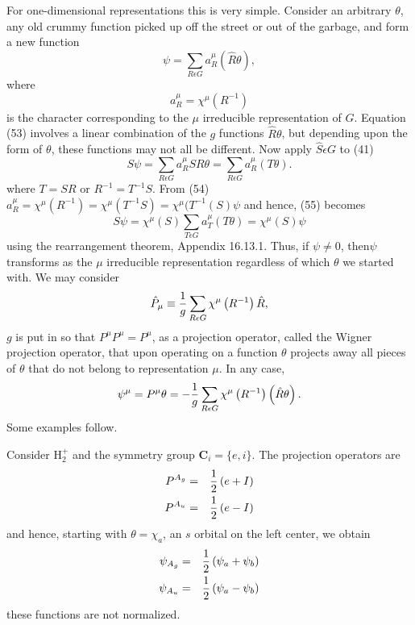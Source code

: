 For one-dimensional representations this is very simple.  Consider an 
arbitrary $\theta$, any old crummy function picked up off the street 
or out of the garbage, and form a new function
\begin{equation}
\psi = \sum_{R \epsilon G} a^{\mu}_R \left( {\hat R} \theta \right), 
\label{chap16-eqno53}
\end{equation}
where
\begin{equation}
a^{\mu}_R = \chi^{\mu} \left( R^{-1} \right)
\label{chap16-eqno54}
\end{equation}
is the character corresponding to the $\mu$ irreducible 
representation of $G$.  Equation (53) involves a linear combination of 
the $g$ functions ${\hat R}\theta$, but depending upon the form of 
$\theta$, these functions may not all be different.  Now apply ${\hat 
S} \epsilon G$ to (41)
\begin{equation}
S \psi = \sum_{R \epsilon G} a^{\mu}_R SR \theta = \sum_{R \epsilon 
G} a^{\mu}_R ( T \theta ).
\label{chap16-eqno55}
\end{equation}
where $T = SR$ or $R^{-1} = T^{-1}S$.  From (54)
$a^{\mu}_R = \chi^{\mu}(R^{-1}) = 
\chi^{\mu}(T^{-1}S) = \chi^{\mu}(T^{-1}(S)\psi$ and hence, (55) becomes
\begin{equation}
S \psi = \chi^{\mu} (S) \sum_{T \epsilon G} a^{\mu}_T ( T \theta ) = 
\chi^{\mu} (S) \psi
\end{equation}
using the rearrangement theorem, Appendix 16.13.1.  Thus, if $\psi \not= 
0$, then$\psi$ transforms as the $\mu$ irreducible representation 
regardless of which $\theta$ we started with.  We may consider
\begin{equation}
{\hat P}_{\mu} \equiv {1 \over g} \sum_{R \epsilon G} \chi^{\mu} 
\left( R^{-1} \right) {\hat R} ,
\end{equation}
$g$ is put in so that $P^{\mu}P^{\mu} = P^{\mu}$, as a projection 
operator, called the Wigner projection operator, that upon operating 
on a function $\theta$ projects away all pieces of $\theta$ that do 
not belong to representation $\mu$.  In any case,
\begin{equation}
\psi^{\mu} = P^{\mu} \theta =- {1 \over g} \sum_{R \epsilon G} 
\chi^{\mu} \left( R^{-1} \right) \left( {\hat R} \theta 
\right).
\label{chap16-eqno56}
\end{equation}
Some examples follow.

Consider H$^+_2$ and the symmetry group {\bf C}$_i = \{ e , i \}$.  
The projection operators are
\begin{eqnarray}
P^{A_g} &=& {1 \over 2} \left( e + I \right)\cr
P^{A_u} &=& {1 \over 2} \left( e - I \right)
\end{eqnarray}
and hence, starting with $\theta = \chi_a$, an $s$ orbital on the left 
center, we obtain
\begin{eqnarray}
\psi_{A_g} &=& {1 \over 2} \left( \psi_a + \psi_b \right)\cr
\psi_{A_u} &=& {1 \over 2} \left( \psi_a - \psi_b \right)
\end{eqnarray}
these functions are not normalized.

